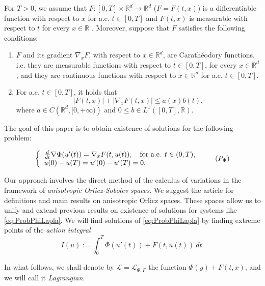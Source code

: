 \documentclass[twoside]{article}
\makeatletter
\theoremstyle{remark}
\newcommand{\labitem}[2]{%
\def\@itemlabel{#1}
\item
\def\@currentlabel{#1}\label{#2}}
\newcommand{\rr}{\mathbb{R}}
\renewcommand{\leq}{\leqslant}
\makeatother
\begin{document}
For $T>0$, we assume that  $F:[0,T]\times\rr^d\to\rr^d$  ($F=F(t,x)$)
  is a differentiable function  with respect to $x$ for a.e. $t\in [0,T]$ and $F(t,x)$ is measurable  with respect to $t$ for every $x\in\rr$ . Moreover, suppose that $F$ satisfies the following conditions:
\begin{enumerate}
\labitem{(C)}{item:condicion_c} $F$ and its gradient $\nabla_x F$, with respect to $x\in\rr^d$,  are  Carath\'eodory functions, i.e. they are measurable functions with respect to $t\in [0,T]$, for every  $x\in\rr^d$, and they are continuous functions with  respect to  $x\in\rr^d$ for a.e. $t \in [0,T]$.
 \labitem{(A)}{item:condicion_a}  For   a.e. $t\in [0,T]$, it holds that
\begin{equation}\label{eq:phi-lagrange}
|F(t,x)| + |\nabla_x F(t,x)|  \leq a(x)b(t),
\end{equation}
where  $a\in C\left(\rr^d,[0,+\infty)\right)$ and $0\leq b\in L^1([0,T],\rr)$.
\end{enumerate}


The goal of this paper is to obtain existence of solutions for  the following problem:

\begin{equation}\label{eq:ProbPhiLapla}
    \left\{%
\begin{array}{ll}
  \frac{d}{dt} \nabla \Phi(u'(t))= \nabla_{x}F(t,u(t)), \quad \hbox{for a.e. } t \in (0,T),\\
    u(0)-u(T)=u'(0)-u'(T)=0.
\end{array}%
\right. \tag{${P_{\Phi}}$}
\end{equation}






Our approach involves the direct method of the calculus of variations in the framework of \emph{anisotropic Orlicz-Sobolev spaces}. 
We suggest the article  \cite{Orliczvectorial2005} for definitions and main results on anisotropic Orlicz spaces. These spaces allow us to unify and extend previous results on existence of solutions for systems like \eqref{eq:ProbPhiLapla}.
 We will find solutions of \eqref{eq:ProbPhiLapla} by finding extreme points of the \emph{action integral} 
\begin{equation}\label{eq:integral_accion}
  I(u):=\int_{0}^T \Phi(u'(t))+ F(t,u(t))\ dt.\tag{$IA$}
\end{equation}

In what follows, we shall denote by $\mathcal{L}=\mathcal{L}_{\Phi,F}$ the function $\Phi(y)+F(t,x)$, and we will call it \emph{Lagrangian}. 
\end{document}
